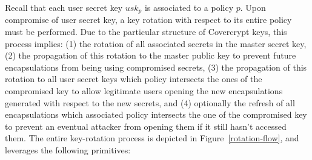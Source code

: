 \documentclass[a4paper]{article}
\theoremstyle{definition}
\begin{document}
Recall that  each user secret  key \(usk_p\) is associated  to a policy  \(p\). Upon
compromise of user secret key, a key  rotation with respect to its entire policy
must be  performed.  Due to  the particular  structure of Covercrypt  keys, this
process implies: (1) the rotation of all associated secrets in the master secret
key, (2) the  propagation of this rotation  to the master public  key to prevent
future encapsulations from being using  compromised secrets, (3) the propagation
of this rotation to all user secret keys which policy intersects the ones of the
compromised  key  to  allow  legitimate users  opening  the  new  encapsulations
generated with respect to the new secrets, and (4) optionally the refresh of all
encapsulations which associated policy intersects the one of the compromised key
to prevent  an eventual attacker from  opening them if it  still hasn't accessed
them.      The     entire     key-rotation    process     is     depicted     in
Figure \ref{rotation-flow}, and leverages the following primitives:
\end{document}
